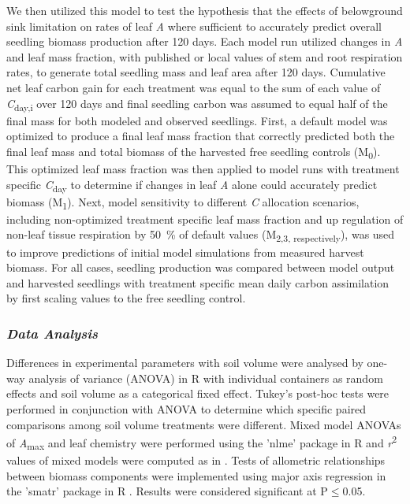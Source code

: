\documentclass[a4paper]{article}\usepackage[]{graphicx}\usepackage[]{color}
\begin{document}
We then utilized this model to test the hypothesis that the effects of belowground sink limitation on rates of leaf \textit{A} where sufficient to accurately predict overall seedling biomass production after 120 days. Each model run utilized changes in \textit{A} and leaf mass fraction, with published or local values of stem and root respiration rates, to generate total seedling mass and leaf area after 120 days.  Cumulative net leaf carbon gain for each treatment was equal to the sum of each value of \textit{C}\textsubscript{day,i} over 120 days and final seedling carbon was assumed to equal half of the final mass for both modeled and observed seedlings. First, a default model was optimized to produce a final leaf mass fraction that correctly predicted both the final leaf mass and total biomass of the harvested free seedling controls (M\textsubscript{0}).  This optimized leaf mass fraction was then applied to model runs with treatment specific \textit{C}\textsubscript{day} to determine if changes in  leaf \textit{A} alone could accurately predict biomass (M\textsubscript{1}). Next, model sensitivity to different \textit{C} allocation scenarios, including non-optimized treatment specific leaf mass fraction and up regulation of non-leaf tissue respiration by 50~\% of default values (M\textsubscript{2,3, respectively}), was used to improve predictions of initial model simulations from measured harvest biomass. For all cases, seedling production was compared between model output and harvested seedlings with treatment specific mean daily carbon assimilation by first scaling values to the free seedling control.

\subsubsection*{\textit{Data Analysis}}

Differences in experimental parameters with soil volume were analysed by one-way analysis of variance (ANOVA) in R with individual containers as random effects and soil volume as a categorical fixed effect. Tukey’s post-hoc tests were performed in conjunction with ANOVA to determine which specific paired comparisons among soil volume treatments were different. Mixed model ANOVAs of \textit{A}\textsubscript{max} and leaf chemistry were performed using the 'nlme' package \citep{nlme} in R and \textit{r}\textsuperscript{2} values of mixed models were computed as in \citet{nakagawa2013general}. Tests of allometric relationships between biomass components were implemented using major axis regression in the 'smatr' package in R \citep{warton2012smatr}. Results were considered significant at P$\leq$0.05.
\end{document}
